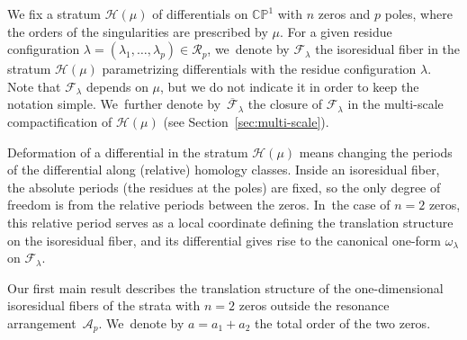 \documentclass[JEP,XML,SOM,Unicode,NoFloatCountersInSection,published]{cedram}
\newcommand\calF{{\mathcal F}}
\theoremstyle{definition}
\begin{document}
We fix a stratum $\mathcal{H}(\mu)$ of differentials on $\mathbb{CP}^1$ with $n$ zeros and $p$ poles, where the orders of the singularities are prescribed by $\mu$. For a given residue configuration $\lambda=(\lambda_{1},\dots,\lambda_{p}) \in \mathcal{R}_{p}$, we~denote by $\mathcal{F}_{\lambda}$ the isoresidual fiber in the stratum $\mathcal{H}(\mu)$ parametrizing differentials with the residue configuration $\lambda$. Note that $\mathcal{F}_{\lambda}$ depends on $\mu$, but we do not indicate it in order to keep the notation simple. We~further denote by~$\overline{\mathcal{F}}_{\lambda}$ the closure of $\mathcal{F}_{\lambda}$ in the multi-scale compactification of $\mathcal{H}(\mu)$ (see Section~\ref{sec:multi-scale}).

Deformation of a differential in the stratum $\mathcal{H}(\mu)$ means changing the periods of the differential along (relative) homology classes. Inside an isoresidual fiber, the absolute periods (\ie the residues at the poles) are fixed, so the only degree of freedom is from the relative periods between the zeros. In~the case of $n=2$ zeros, this relative period serves as a local coordinate defining the translation structure on the isoresidual fiber, and its differential gives rise to the canonical one-form $\omega_{\lambda}$ on $\calF_{\lambda}$.

Our first main result describes the translation structure of the one-dimensional isoresidual fibers of the strata with $n=2$ zeros outside the resonance arrangement~$\mathcal{A}_{p}$. We~denote by $a = a_{1}+a_{2}$ the total order of the two zeros.
\end{document}
